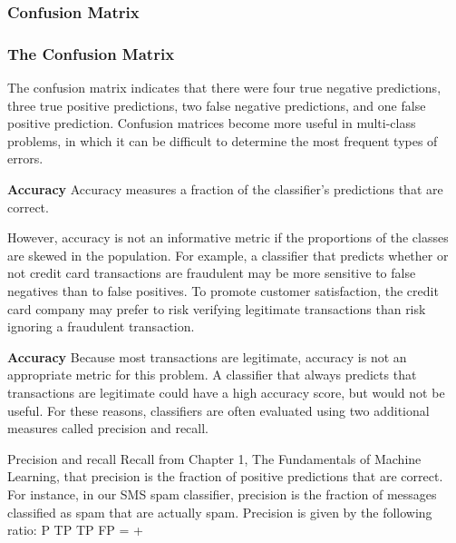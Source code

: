\documentclass[PredictiveAnalytics101.tex]{subfiles}
\begin{document}
 

\begin{frame}
\frametitle{Confusion Matrix}

\end{frame}

\begin{frame}
\frametitle{The Confusion Matrix}
The confusion matrix indicates that there were four true negative predictions, three
true positive predictions, two false negative predictions, and one false positive
prediction. Confusion matrices become more useful in multi-class problems, in
which it can be difficult to determine the most frequent types of errors.
\end{frame}
\begin{frame}
\textbf{Accuracy}
Accuracy measures a fraction of the classifier's predictions that are correct.

However, accuracy is not an informative metric if the proportions of
the classes are skewed in the population. For example, a classifier that predicts
whether or not credit card transactions are fraudulent may be more sensitive to
false negatives than to false positives. To promote customer satisfaction, the credit
card company may prefer to risk verifying legitimate transactions than risk ignoring
a fraudulent transaction. 
\end{frame}
\begin{frame}
\textbf{Accuracy}
Because most transactions are legitimate, accuracy is
not an appropriate metric for this problem. A classifier that always predicts that
transactions are legitimate could have a high accuracy score, but would not be
useful. For these reasons, classifiers are often evaluated using two additional
measures called precision and recall.
\end{frame}
\begin{frame}
Precision and recall
Recall from Chapter 1, The Fundamentals of Machine Learning, that precision is the
fraction of positive predictions that are correct. For instance, in our SMS spam
classifier, precision is the fraction of messages classified as spam that are actually
spam. Precision is given by the following ratio:
P TP
TP FP
=
+
\end{frame}
\end{document}
